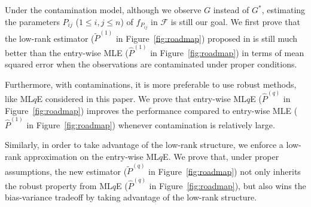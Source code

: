 \documentclass[a4paper]{article}
\renewcommand{\hat}{\widehat}
\begin{document}
Under the contamination model, although we observe $G$ instead of $G^*$, estimating the parameters $P_{ij}$ ($1 \le i, j \le n$) of $f_{P_{ij}}$ in $\mathcal{F}$ is still our goal. We first prove that the low-rank estimator ($\widetilde{P}^{(1)}$ in Figure~\ref{fig:roadmap}) proposed in \citep{tang2016law} is still much better than the entry-wise MLE ($\hat{P}^{(1)}$ in Figure~\ref{fig:roadmap}) in terms of mean squared error when the observations are contaminated under proper conditions.

Furthermore, with contaminations, it is more preferable to use robust methods, like ML$q$E \citep{ferrari2010, qin2013maximum} considered in this paper. We prove that entry-wise ML$q$E ($\hat{P}^{(q)}$ in Figure~\ref{fig:roadmap}) improves the performance compared to entry-wise MLE ($\hat{P}^{(1)}$ in Figure~\ref{fig:roadmap}) whenever contamination is relatively large.

Similarly, in order to take advantage of the low-rank structure, we enforce a low-rank approximation on the entry-wise ML$q$E. We prove that, under proper assumptions, the new estimator ($\widetilde{P}^{(q)}$ in Figure~\ref{fig:roadmap}) not only inherits the robust property from ML$q$E ($\hat{P}^{(q)}$ in Figure~\ref{fig:roadmap}), but also wins the bias-variance tradeoff by taking advantage of the low-rank structure.
\end{document}
